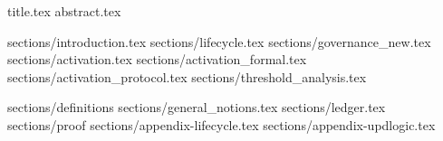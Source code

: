 \documentclass{llncs}
\begin{document}
{title.tex}
{abstract.tex}

{sections/introduction.tex}
{sections/lifecycle.tex}
{sections/governance_new.tex}
{sections/activation.tex}
{sections/activation_formal.tex}
{sections/activation_protocol.tex}
{sections/threshold_analysis.tex}
\clearpage


\appendix
{sections/definitions}
{sections/general_notions.tex}
{sections/ledger.tex}
{sections/proof}
{sections/appendix-lifecycle.tex}
{sections/appendix-updlogic.tex}
\end{document}
